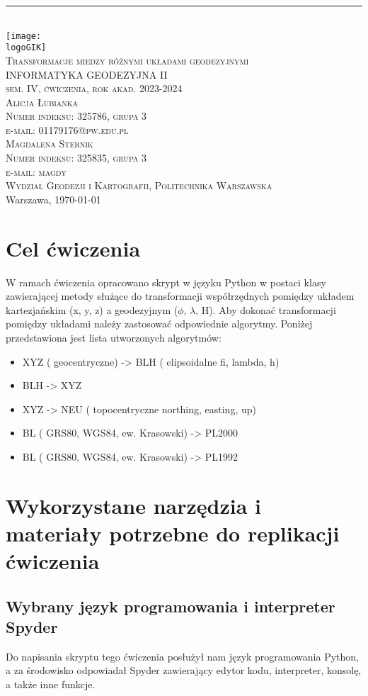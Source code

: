 \documentclass[10pt,a4paper]{article}
\makeatletter
\newcommand{\logoGIK}{WGiK-znak.png}
\newcommand{\authorName}{Alicja Łubianka \\ Numer indeksu: 325786, grupa 3 \\ e-mail: 01179176@pw.edu.pl\\ Magdalena Sternik \\ Numer indeksu: 325835, grupa 3 \\ e-mail: magdy}
\newcommand{\titeReport}{Transformacje miedzy różnymi układami geodezyjnymi} %
\newcommand{\titleLecture}{INFORMATYKA GEODEZYJNA II\\ sem. IV, ćwiczenia, rok akad. 2023-2024} %
\newcommand{\faculty}{Wydział Geodezji i Kartografii}
\newcommand{\university}{Politechnika Warszawska}
\newcommand{\city}{Warszawa}
\makeatother
\begin{document}
	\begin{center} 
		\rule{\textwidth}{.5pt} \\
		\vspace{1.0cm}
		\texttt{[image: \\logoGIK]}
		\vspace{0.5cm} \\
		\Large \textsc{\titeReport}
		\vspace{0.5cm} \\  
		\large \textsc{\titleLecture}
		\vspace{0.5cm}\\
		\textsc{\authorName}  \\
		\textsc{\faculty}, \textsc{\university}  \\ 
		\city, \today
	\end{center}
	\newpage
	\tableofcontents
	\newpage
	\section{Cel ćwiczenia}
	W ramach ćwiczenia opracowano skrypt w języku Python w postaci klasy zawierającej metody służące do transformacji współrzędnych pomiędzy układem kartezjańskim (x, y, z) a geodezyjnym ($\phi$, $\lambda$, H). Aby dokonać transformacji pomiędzy układami należy zastosować odpowiednie algorytmy. Poniżej przedstawiona jest lista utworzonych algorytmów:
	\begin{itemize}
		\item XYZ ( geocentryczne) -> BLH ( elipsoidalne fi, lambda, h)
		\item BLH -> XYZ 
		\item XYZ -> NEU ( topocentryczne northing, easting, up)
		\item BL ( GRS80, WGS84, ew. Krasowski) -> PL2000
		\item BL ( GRS80, WGS84, ew. Krasowski) -> PL1992
		
	\end{itemize}
	\section{Wykorzystane narzędzia i materiały potrzebne do replikacji ćwiczenia}
	
	\subsection{Wybrany język programowania i interpreter Spyder}
	

		
	Do napisania skryptu tego ćwiczenia posłużył nam język programowania Python, a za środowisko odpowiadał Spyder zawierający edytor kodu, interpreter, konsolę, a także inne funkcje.
	 
\end{document}
